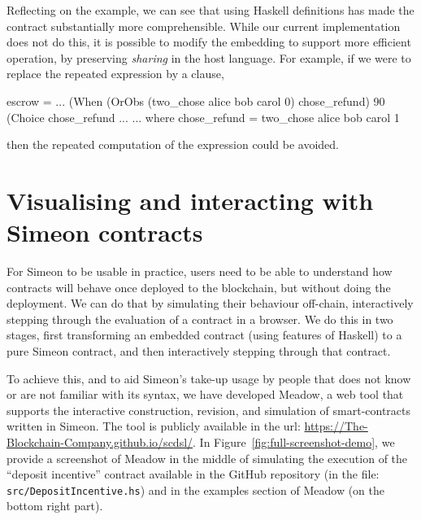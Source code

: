 \documentclass[runningheads]{llncs}
\begin{document}
Reflecting on the example, we can see that using Haskell definitions has made the contract substantially more 
comprehensible. While our current implementation does not do this, it is possible to modify the embedding to support 
more efficient operation, by preserving \emph{sharing} in the host language. For example, if we were to replace the 
repeated  expression 
 by a  clause, 
\begin{haskellcode}
escrow = ...        (When (OrObs (two_chose alice bob carol 0)
                                 chose_refund)
                          90
                          (Choice chose_refund ...
                           ...
         where chose_refund = two_chose alice bob carol 1                 
\end{haskellcode}
then the repeated computation of the expression could be avoided.

\section{Visualising and interacting with Simeon contracts}

\label{section:tool}

For Simeon to be usable in practice, users need to be able to understand how contracts will behave once deployed to 
the blockchain, but without doing the deployment. We can do that by simulating their behaviour off-chain, interactively 
stepping through the evaluation of a contract in a browser. We do this in two stages, first transforming an embedded 
contract (using features of Haskell) to a pure Simeon contract, and then interactively stepping through that contract.

To achieve this, and to aid Simeon's take-up
usage by people that does not know or are not familiar with its syntax,
we have developed Meadow, a web tool that supports the interactive construction,
revision, and simulation of smart-contracts written in Simeon. The
tool is publicly available in the url: \url{https://The-Blockchain-Company.github.io/scdsl/}.
In Figure~\ref{fig:full-screenshot-demo}, we provide a screenshot
of Meadow in the middle of simulating the execution of the ``deposit incentive'' contract available
in the GitHub repository (in the file: \texttt{src/DepositIncentive.hs}) and in the examples section of Meadow (on the 
bottom right part).
\end{document}
